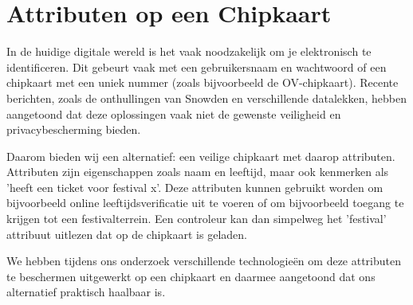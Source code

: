 \chapter*{Attributen op een Chipkaart}

In de huidige digitale wereld is het vaak noodzakelijk om je elektronisch te 
identificeren. Dit gebeurt vaak met een gebruikersnaam en wachtwoord of een 
chipkaart met een uniek nummer (zoals bijvoorbeeld de OV-chipkaart). Recente 
berichten, zoals de onthullingen van Snowden en verschillende datalekken, 
hebben aangetoond dat deze oplossingen vaak niet de gewenste veiligheid en 
privacybescherming bieden.

Daarom bieden wij een alternatief: een veilige chipkaart met daarop attributen.
Attributen zijn eigenschappen zoals naam en leeftijd, maar ook kenmerken als
'heeft een ticket voor festival x'. Deze attributen kunnen gebruikt worden om 
bijvoorbeeld online leeftijdsverificatie uit te voeren of om bijvoorbeeld 
toegang te krijgen tot een festivalterrein. Een controleur kan dan simpelweg 
het 'festival' attribuut uitlezen dat op de chipkaart is geladen.

We hebben tijdens ons onderzoek verschillende technologie\"{e}n om deze 
attributen te beschermen uitgewerkt op een chipkaart en daarmee aangetoond 
dat ons alternatief praktisch haalbaar is.

